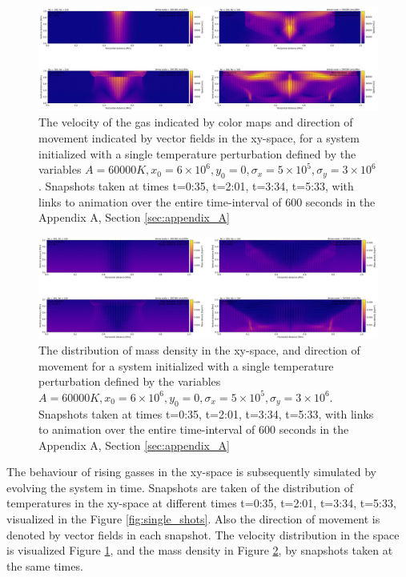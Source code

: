 \documentclass[10pt, nofootinbib, twocolumn]{revtex4-1}
\begin{document}
\begin{figure}
    \centering
    \includegraphics[width=1\textwidth]{figures/single_velocity_collage.png} 
    \caption{The velocity of the gas indicated by color maps and direction of movement indicated by vector fields in the xy-space, for a system initialized with a single temperature perturbation defined by the variables $A=60000 K, x_0=6\times 10^6, y_0=0, \sigma_x=5\times 10^5, \sigma_y=3\times 10^6$. Snapshots taken at times t=0:35, t=2:01, t=3:34, t=5:33, with links to animation over the entire time-interval of 600 seconds in the Appendix A, Section \ref{sec:appendix_A}}
    \label{fig:single_vel}
\end{figure}
\begin{figure}
    \centering
    \includegraphics[width=1\textwidth]{figures/single_densities_collage.png} 
    \caption{The distribution of mass density in the xy-space, and direction of movement for a system initialized with a single temperature perturbation defined by the variables $A=60000 K, x_0=6\times 10^6, y_0=0, \sigma_x=5\times 10^5, \sigma_y=3\times 10^6$. Snapshots taken at times t=0:35, t=2:01, t=3:34, t=5:33, with links to animation over the entire time-interval of 600 seconds in the Appendix A, Section \ref{sec:appendix_A}}
    \label{fig:single_dens}
\end{figure}
The behaviour of rising gasses in the xy-space is subsequently simulated by evolving the system in time. Snapshots are taken of the distribution of temperatures in the xy-space at different times t=0:35, t=2:01, t=3:34, t=5:33, visualized in the Figure \ref{fig:single_shots}. Also the direction of movement is denoted by vector fields in each snapshot. The velocity distribution in the space is visualized Figure \ref{fig:single_vel}, and the mass density in Figure \ref{fig:single_dens}, by snapshots taken at the same times. \\ 
\end{document}
